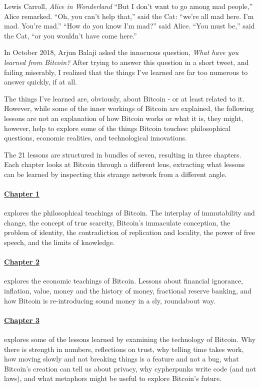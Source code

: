 \label{ch:introduction}

\begin{chapquote}{Lewis Carroll, \textit{Alice in Wonderland}}
``But I don’t want to go among mad people,'' Alice remarked. ``Oh, you can’t
help that,'' said the Cat: ``we’re all mad here. I’m mad. You’re mad.'' ``How do
you know I’m mad?'' said Alice. ``You must be,'' said the Cat, ``or you wouldn’t
have come here.''
\end{chapquote}

In October 2018, Arjun Balaji asked the innocuous question,
\textit{What have you learned from Bitcoin?} After trying to answer this
question in a short tweet, and failing miserably, I realized that the things
I've learned are far too numerous to answer quickly, if at all.

The things I've learned are, obviously, about Bitcoin - or at least related to
it. However, while some of the inner workings of Bitcoin are explained, the
following lessons are not an explanation of how Bitcoin works or what it is,
they might, however, help to explore some of the things Bitcoin touches:
philosophical questions, economic realities, and technological innovations.

The 21 lessons are structured in bundles of seven, resulting in three chapters.
Each chapter looks at Bitcoin through a different lens, extracting what
lessons can be learned by inspecting this strange network from a different
angle.

\paragraph{\hyperref[ch:philosophy]{Chapter 1}}{explores the philosophical teachings of
Bitcoin. The interplay of immutability and change, the concept of true scarcity,
Bitcoin's immaculate conception, the problem of identity, the contradiction of
replication and locality, the power of free speech, and the limits of knowledge.
}

\paragraph{\hyperref[ch:economics]{Chapter 2}}{explores the economic teachings of Bitcoin.
Lessons about financial ignorance, inflation, value, money and the history of
money, fractional reserve banking, and how Bitcoin is re-introducing sound money
in a sly, roundabout way.}

\paragraph{\hyperref[ch:technology]{Chapter 3}}{explores some of the lessons learned by
examining the technology of Bitcoin.  Why there is strength in numbers,
reflections on trust, why telling time takes work, how moving slowly and not
breaking things is a feature and not a bug, what Bitcoin's creation can tell us
about privacy, why cypherpunks write code (and not laws), and what metaphors
might be useful to explore Bitcoin's future.}


